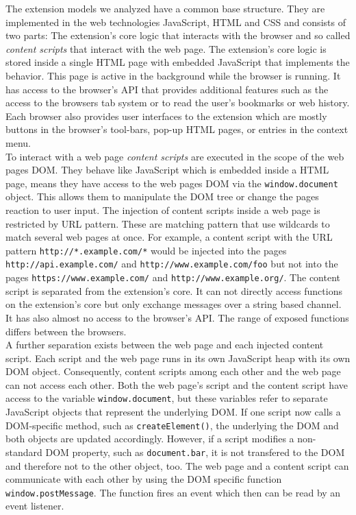 \documentclass[article,colorback,accentcolor=tud9c,type=bsc]{tudthesis}
\begin{document}
	The extension models we analyzed have a common base structure. They are implemented in the web technologies JavaScript, HTML and CSS and consists of two parts: The extension's core logic that interacts with the browser and so called \textit{content scripts} that interact with the web page. The extension's core logic is stored inside a single HTML page with embedded JavaScript that implements the behavior. This page is active in the background while the browser is running. It has access to the browser's API that provides additional features such as the access to the browsers tab system or to read the user's bookmarks or web history. Each browser also provides user interfaces to the extension which are mostly buttons in the browser's tool-bars, pop-up HTML pages, or entries in the context menu. \\
	To interact with a web page \textit{content scripts} are executed in the scope of the web pages DOM. They behave like JavaScript which is embedded inside a HTML page, means they have access to the web pages DOM via the \texttt{window.document} object. This allows them to manipulate the DOM tree or change the pages reaction to user input. The injection of content scripts inside a web page is restricted by URL pattern. These are matching pattern that use wildcards to match several web pages at once. For example, a content script with the URL pattern \texttt{http://*.example.com/*} would be injected into the pages \texttt{http://api.example.com/} and \texttt{http://www.example.com/foo} but not into the pages \texttt{https://www.example.com/} and \texttt{http://www.example.org/}. The content script is separated from the extension's core. It can not directly access functions on the extension's core but only exchange messages over a string based channel. It has also almost no access to the browser's API. The range of exposed functions differs between the browsers. \\ 
	A further separation exists between the web page and each injected content script. Each script and the web page runs in its own JavaScript heap with its own DOM object. Consequently, content scripts among each other and the web page can not access each other. Both the web page's script and the content script have access to the variable \texttt{window.document}, but these variables refer to separate JavaScript objects that represent the underlying DOM. If one script now calls a DOM-specific method, such as \texttt{createElement()}, the underlying the DOM and both objects are updated accordingly. However, if a script modifies a non-standard DOM property, such as \texttt{document.bar}, it is not transfered to the DOM and therefore not to the other object, too. The web page and a content script can communicate with each other by using the DOM specific function \texttt{window.postMessage}. The function fires an event which then can be read by an event listener.
	
\end{document}
